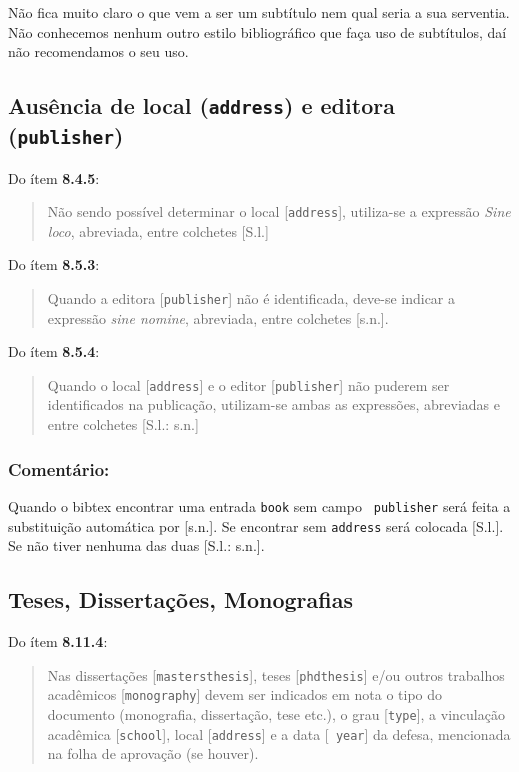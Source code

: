 \documentclass[a4paper]{ltxdoc}
\begin{document}
Não fica muito claro o que vem a ser um subtítulo nem qual seria a sua
serventia. Não conhecemos nenhum outro estilo bibliográfico que faça uso de
subtítulos, daí não recomendamos o seu uso.

\subsection{Ausência de local ({\tt address}) e editora ({\tt publisher})}

Do ítem {\bf 8.4.5}\cite{NBR6023:2000}:
\begin{quote}
Não sendo possível determinar o local [{\tt address}], utiliza-se a expressão \emph{Sine loco},
abreviada, entre colchetes [S.l.]
\end{quote}

Do ítem {\bf 8.5.3}\cite{NBR6023:2000}:
\begin{quote}
Quando a editora [{\tt publisher}] não é identificada, deve-se indicar a expressão
\emph{sine nomine}, abreviada, entre colchetes [s.n.].
\end{quote}

Do ítem {\bf 8.5.4}\cite{NBR6023:2000}:
\begin{quote}
Quando o local [{\tt address}] e o editor [{\tt publisher}] não puderem ser
identificados na publicação, utilizam-se ambas as expressões, abreviadas e
entre colchetes [S.l.: s.n.]
\end{quote}

\subsubsection{Comentário:}
Quando o \textsf{bibtex} encontrar uma entrada {\tt book} sem campo {\tt
publisher} será feita a substituição automática por [s.n.].
\cite{8.5.3}
Se encontrar sem {\tt address} será colocada [S.l.]. \cite{8.4.5-1,8.4.5-2}
Se não tiver nenhuma das duas [S.l.: s.n.]. \cite{8.5.4}

\subsection{Teses, Dissertações, Monografias}
\label{sec-teses}

Do ítem {\bf 8.11.4}\cite{NBR6023:2000}:
\begin{quote}
Nas dissertações [{\tt mastersthesis}], teses [{\tt phdthesis}] e/ou outros
trabalhos acadêmicos [{\tt monography}] devem ser indicados em nota o tipo do
documento (monografia, dissertação, tese etc.), o grau [{\tt type}], a
vinculação acadêmica [{\tt school}], local [{\tt address}] e a data [{\tt
year}] da defesa, mencionada na folha de aprovação (se houver).
\cite{8.11.4-1,8.11.4-2,8.11.4-1b,8.11.4-1c}
\end{quote}
\end{document}

